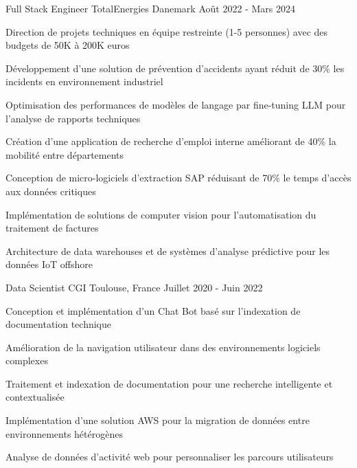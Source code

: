 \begin{cventries}

\cventry
{Full Stack Engineer} %
{TotalEnergies} %
{Danemark} %
{Août 2022 - Mars 2024} %
{ %
\begin{cvitems}
\item {Direction de projets techniques en équipe restreinte (1-5 personnes) avec des budgets de 50K à 200K euros}
\item {Développement d'une solution de prévention d'accidents ayant réduit de 30\% les incidents en environnement industriel}
\item {Optimisation des performances de modèles de langage par fine-tuning LLM pour l'analyse de rapports techniques}
\item {Création d'une application de recherche d'emploi interne améliorant de 40\% la mobilité entre départements}
\item {Conception de micro-logiciels d'extraction SAP réduisant de 70\% le temps d'accès aux données critiques}
\item {Implémentation de solutions de computer vision pour l'automatisation du traitement de factures}
\item {Architecture de data warehouses et de systèmes d'analyse prédictive pour les données IoT offshore}
\end{cvitems}
}
\vspace{1.5em}


\cventry
{Data Scientist} %
{CGI} %
{Toulouse, France} %
{Juillet 2020 - Juin 2022} %
{ %
\begin{cvitems}
\item {Conception et implémentation d'un Chat Bot basé sur l'indexation de documentation technique}
\item {Amélioration de la navigation utilisateur dans des environnements logiciels complexes}
\item {Traitement et indexation de documentation pour une recherche intelligente et contextualisée}
\item {Implémentation d'une solution AWS pour la migration de données entre environnements hétérogènes}
\item {Analyse de données d'activité web pour personnaliser les parcours utilisateurs}
\end{cvitems}
}
\vspace{1.5em}


\end{cventries}
